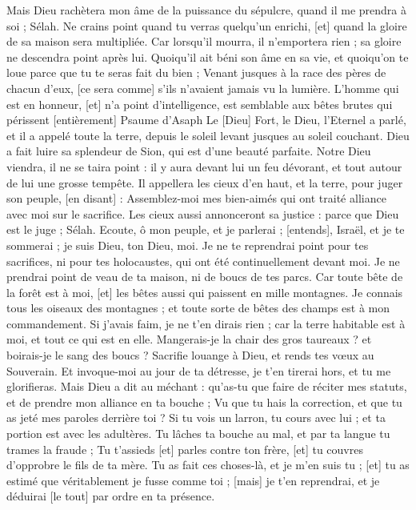 \begin{multicols}{2}
Mais Dieu rachètera mon âme de la puissance du sépulcre, quand il me prendra à soi ; Sélah.
Ne crains point quand tu verras quelqu'un enrichi, [et] quand la gloire de sa maison sera multipliée.
Car lorsqu'il mourra, il n'emportera rien ; sa gloire ne descendra point après lui.
Quoiqu'il ait béni son âme en sa vie, et quoiqu'on te loue parce que tu te seras fait du bien ;
Venant jusques à la race des pères de chacun d'eux, [ce sera comme] s'ils n'avaient jamais vu la lumière.
L'homme qui est en honneur, [et] n'a point d'intelligence, est semblable aux bêtes brutes qui périssent [entièrement]
\VerseOne{}Psaume d'Asaph Le [Dieu] Fort, le Dieu, l'Eternel a parlé, et il a appelé toute la terre, depuis le soleil levant jusques au soleil couchant.
Dieu a fait luire sa splendeur de Sion, qui est d'une beauté parfaite.
Notre Dieu viendra, il ne se taira point : il y aura devant lui un feu dévorant, et tout autour de lui une grosse tempête.
Il appellera les cieux d'en haut, et la terre, pour juger son peuple, [en disant] :
Assemblez-moi mes bien-aimés qui ont traité alliance avec moi sur le sacrifice.
Les cieux aussi annonceront sa justice : parce que Dieu est le juge ; Sélah.
Ecoute, ô mon peuple, et je parlerai ; [entends], Israël, et je te sommerai ; je suis Dieu, ton Dieu, moi.
Je ne te reprendrai point pour tes sacrifices, ni pour tes holocaustes, qui ont été continuellement devant moi.
Je ne prendrai point de veau de ta maison, ni de boucs de tes parcs.
Car toute bête de la forêt est à moi, [et] les bêtes aussi qui paissent en mille montagnes.
Je connais tous les oiseaux des montagnes ; et toute sorte de bêtes des champs est à mon commandement.
Si j'avais faim, je ne t'en dirais rien ; car la terre habitable est à moi, et tout ce qui est en elle.
Mangerais-je la chair des gros taureaux ? et boirais-je le sang des boucs ?
Sacrifie louange à Dieu, et rends tes vœux au Souverain.
Et invoque-moi au jour de ta détresse, je t'en tirerai hors, et tu me glorifieras.
Mais Dieu a dit au méchant : qu'as-tu que faire de réciter mes statuts, et de prendre mon alliance en ta bouche ;
Vu que tu hais la correction, et que tu as jeté mes paroles derrière toi ?
Si tu vois un larron, tu cours avec lui ; et ta portion est avec les adultères.
Tu lâches ta bouche au mal, et par ta langue tu trames la fraude ;
Tu t'assieds [et] parles contre ton frère, [et] tu couvres d'opprobre le fils de ta mère.
Tu as fait ces choses-là, et je m'en suis tu ; [et] tu as estimé que véritablement je fusse comme toi ; [mais] je t'en reprendrai, et je déduirai [le tout] par ordre en ta présence.

\end{multicols}
